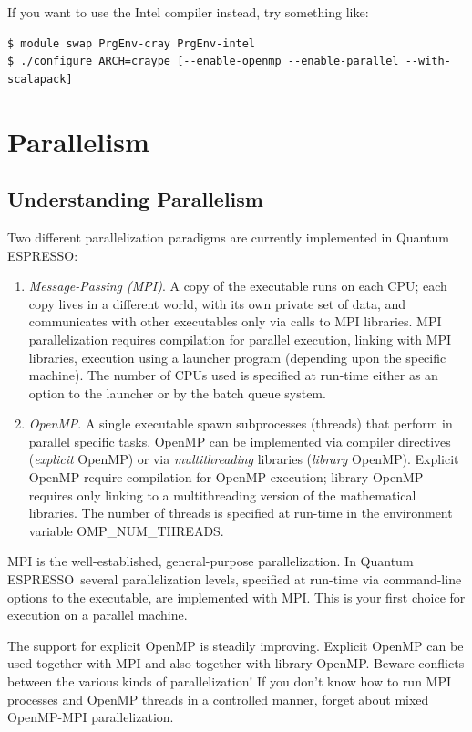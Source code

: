 \documentclass[12pt,a4paper]{article}
\def\qe{{\sc Quantum ESPRESSO}}
\begin{document}
If you want to use the Intel compiler instead, try something like:
\begin{verbatim}
$ module swap PrgEnv-cray PrgEnv-intel
$ ./configure ARCH=craype [--enable-openmp --enable-parallel --with-scalapack]
\end{verbatim}

\newpage

\section{Parallelism}
\label{Sec:para}

\subsection{Understanding Parallelism}

Two different parallelization paradigms are currently implemented
in \qe:
\begin{enumerate}
\item {\em Message-Passing (MPI)}. A copy of the executable runs
on each CPU; each copy lives in a different world, with its own
private set of data, and communicates with other executables only
via calls to MPI libraries. MPI parallelization requires compilation
for parallel execution, linking with MPI libraries, execution using
a launcher program (depending upon the specific machine). The number
of CPUs used
is specified at run-time either as an option to the launcher or
by the batch queue system.
\item {\em OpenMP}.  A single executable spawn subprocesses
(threads) that perform in parallel specific tasks.
OpenMP can be implemented via compiler directives ({\em explicit}
OpenMP) or via {\em multithreading} libraries  ({\em library} OpenMP).
Explicit OpenMP require compilation for OpenMP execution;
library OpenMP requires only linking to a multithreading
version of the mathematical libraries.
The number of threads is specified at run-time in the environment
variable OMP\_NUM\_THREADS.
\end{enumerate}

MPI is the well-established, general-purpose parallelization.
In \qe\ several parallelization levels, specified at run-time
via command-line options to the executable, are implemented
with MPI. This is your first choice for execution on a parallel
machine.

The support for explicit OpenMP is steadily improving.
Explicit OpenMP can be used together with MPI and also
together with library OpenMP. Beware
conflicts between the various kinds of parallelization!
If you don't know how to run MPI processes
and OpenMP threads in a controlled manner, forget about mixed
OpenMP-MPI parallelization.
\end{document}
